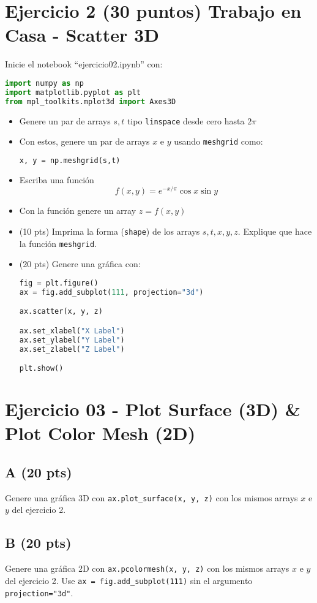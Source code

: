 \documentclass{article}
\begin{document}
\section{Ejercicio 2 (30 puntos) Trabajo en Casa - Scatter 3D}

Inicie el notebook ``ejercicio02.ipynb'' con:
\begin{lstlisting}[language=Python]
import numpy as np
import matplotlib.pyplot as plt
from mpl_toolkits.mplot3d import Axes3D
\end{lstlisting}

\begin{itemize}

\item Genere un par de arrays $s, t$  tipo \texttt{linspace} desde cero hasta $2\pi$

\item Con estos, genere un par de arrays $x$ e $y$ usando \texttt{meshgrid} como:
\begin{lstlisting}[language=Python]
x, y = np.meshgrid(s,t)
\end{lstlisting}

\item Escriba una función
  \begin{equation}
    f(x,y) =  e^{-x/\pi}  \cos x \sin y
  \end{equation}
\item Con la función genere un array $z = f(x,y)$

\item (10 pts) Imprima la forma (\texttt{shape}) de los arrays $s, t, x, y, z$.
  Explique que hace la función \texttt{meshgrid}.
  
  
\item (20 pts) Genere una gráfica con:
\begin{lstlisting}[language=Python]
fig = plt.figure()
ax = fig.add_subplot(111, projection="3d")

ax.scatter(x, y, z)

ax.set_xlabel("X Label")
ax.set_ylabel("Y Label")
ax.set_zlabel("Z Label")

plt.show()
\end{lstlisting}
\end{itemize}



\section{Ejercicio 03 - Plot Surface (3D) \& Plot Color Mesh (2D)}

\subsection{A (20 pts)}
Genere una gráfica 3D con \texttt{ax.plot\_surface(x, y, z)} con los mismos arrays $x$ e $y$ del ejercicio 2.
\subsection{B (20 pts)}
Genere una gráfica 2D con \texttt{ax.pcolormesh(x, y, z)} con los mismos arrays $x$ e $y$ del ejercicio 2.
Use \texttt{ax = fig.add\_subplot(111)} sin el argumento \texttt{projection="3d"}.
\end{document}
